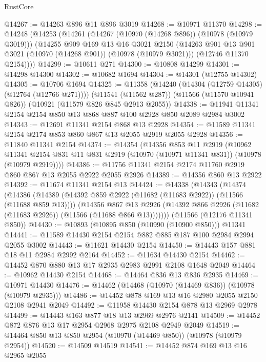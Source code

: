 \begin{lexlean}{RustCore}
\begin{coremodule}
@14267 := @14263 @896 @11 @896 @3019
@14268 := @10971 @11370
@14298 := @14248
    (@14253
      (@14261
        (@14267 (@10970 (@14268 @896)) (@10978 (@10979 @3019)))
        (@14255
          @909
          @169
          @13
          @16
          @3021
          @2150
          (@14263 @901 @13 @901 @3021 (@10970 (@14268 @901)) (@10978 (@10979 @3021)))
          (@12746 @11370 @2154))))
@14299 := @10611 @271
@14300 := @10808 @14299
@14301 := @14298 @14300
@14302 := @10682 @1694
@14304 := @14301 (@12755 @14302)
@14305 := @10706 @1694
@14325 := @11358
    (@14240 (@14304 (@12759 @14305) (@12764 (@12766 @271))))
    (@11541 (@11562 @287))
    (@11566 (@11570 @10941 @826))
    (@10921 (@11579 @826 @845 @2913 @2055))
@14338 := @11941 @11341 @2154 @2154 @850 @13 @868 @887 @100 @2928 @850 @2089 @2984 @3002
@14343 := @12691 @11341 @2154 @868 @13 @2928
@14354 := @11589 @11341 @2154 @2174 @853 @860 @867 @13 @2055 @2919 @2055 @2928
@14356 := @11840 @11341 @2154
@14374 := @14354
    (@14356
      @853
      @11
      @2919
      (@10962
        @11341
        @2154
        @831
        @11
        @831
        @2919
        (@10970 (@10971 @11341 @831))
        (@10978 (@10979 @2919))))
@14386 := @11756 @11341 @2154 @2174 @11760 @2919 @860 @867 @13 @2055 @2922 @2055 @2926
@14389 := @14356 @860 @13 @2922
@14392 := @11674 @11341 @2154 @13
@14424 := @14338
    (@14343
      (@14374
        (@14386
          (@14389 (@14392 @859 @2922 (@11682 (@11683 @2922)) (@11566 (@11688 @859 @13))))
          (@14356
            @867
            @13
            @2926
            (@14392 @866 @2926 (@11682 (@11683 @2926)) (@11566 (@11688 @866 @13)))))))
    (@11566 (@12176 @11341 @850))
@14430 := @10893 (@10895 @850 (@10990 (@10900 @850))) @11341
@14441 := @11589 @14430 @2154 @2154 @882 @885 @187 @100 @2984 @2994 @2055 @3002
@14443 := @11621 @14430 @2154
@14450 := @14443 @157 @881 @18 @11 @2984 @2992 @2164
@14452 := @11634 @14430 @2154
@14462 := @14452 @870 @880 @13 @17 @2935 @2983 @2991 @2108 @1648 @2049
@14464 := @10962 @14430 @2154
@14468 := @14464 @836 @13 @836 @2935
@14469 := @10971 @14430
@14476 := @14462 (@14468 (@10970 (@14469 @836)) (@10978 (@10979 @2935)))
@14486 := @14452 @878 @169 @13 @16 @2980 @2055 @2150 @2108 @2941 @2049
@14492 := @11958 @14430 @2154 @878 @13 @2969 @2978
@14499 := @14443 @163 @877 @18 @13 @2969 @2976 @2141
@14509 := @14452 @872 @876 @13 @17 @2954 @2968 @2975 @2108 @2949 @2049
@14519 := @14464 @850 @13 @850 @2954 (@10970 (@14469 @850)) (@10978 (@10979 @2954))
@14520 := @14509 @14519
@14541 := @14452
    @874
    @169
    @13
    @16
    @2965
    @2055

\end{coremodule}
\end{lexlean}
